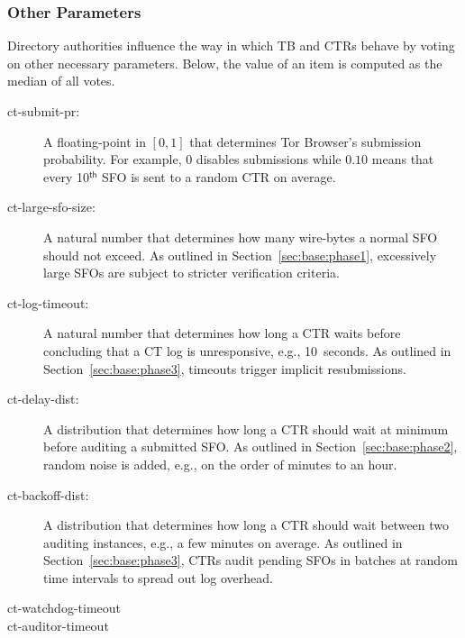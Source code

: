 \subsubsection{Other Parameters} \label{sec:base:consensus:params}
Directory authorities influence the way in which TB and CTRs behave by
voting on other necessary parameters. Below, the value of an item is computed as
the median of all votes.
\begin{description}
    \item[ct-submit-pr:] A floating-point in $[0,1]$ that determines Tor
        Browser's submission probability.  For example, $0$ disables submissions
        while $0.10$ means that every 10$^{\mathsf{th}}$ SFO is sent to a
        random CTR on average.
    \item[ct-large-sfo-size:] A natural number that determines how many
        wire-bytes a normal SFO should not exceed.  As outlined in
        Section~\ref{sec:base:phase1}, excessively large SFOs are subject
        to stricter verification criteria.
    \item[ct-log-timeout:] A natural number that determines how long a CTR
        waits before concluding that a CT log is unresponsive, e.g., 10~seconds.
        As outlined in Section~\ref{sec:base:phase3}, timeouts trigger implicit
        resubmissions.
    \item[ct-delay-dist:] A distribution that determines how long a CTR should
        wait at minimum before auditing a submitted SFO\@.  As outlined in
        Section~\ref{sec:base:phase2}, random noise is added, e.g., on the order of minutes to an hour.
    \item[ct-backoff-dist:]
        A distribution that determines how long a CTR should wait between two
        auditing instances, e.g., a few minutes on average.  As outlined in
        Section~\ref{sec:base:phase3}, CTRs audit pending SFOs in batches at
        random time intervals to spread out log overhead.
    \item[ct-watchdog-timeout]
    \item[ct-auditor-timeout]
\end{description}
